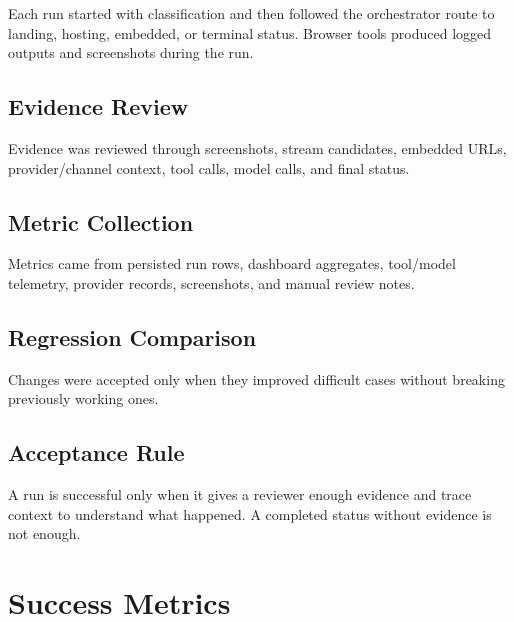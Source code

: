 Each run started with classification and then followed the orchestrator route
to landing, hosting, embedded, or terminal status. Browser tools produced
logged outputs and screenshots during the run.

\subsection{Evidence Review}

Evidence was reviewed through screenshots, stream candidates, embedded URLs,
provider/channel context, tool calls, model calls, and final status.

\subsection{Metric Collection}

Metrics came from persisted run rows, dashboard aggregates, tool/model
telemetry, provider records, screenshots, and manual review notes.

\subsection{Regression Comparison}

Changes were accepted only when they improved difficult cases without breaking
previously working ones.

\subsection{Acceptance Rule}

A run is successful only when it gives a reviewer enough evidence and trace
context to understand what happened. A completed status without evidence is not
enough.

\section{Success Metrics}

